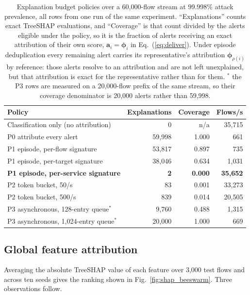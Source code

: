 \documentclass{ieeeaccess}
\begin{document}
\begin{table}[!t]
\caption{Explanation budget policies over a 60,000-flow stream at 99.998\% attack
prevalence, all rows from one run of the same experiment. ``Explanations'' counts
exact TreeSHAP evaluations, and ``Coverage'' is that count divided by the alerts
eligible under the policy, so it is the fraction of alerts receiving an exact
attribution of their own score, $\mathbf{a}_i = \boldsymbol{\phi}_i$ in
Eq.~(\ref{eq:deliver}). Under episode deduplication every remaining alert carries
its representative's attribution $\boldsymbol{\phi}_{\rho(i)}$ by reference: those
alerts resolve to an attribution and are not left unexplained, but that
attribution is exact for the representative rather than for them.
$^{\ast}$ the P3 rows are measured on a 20,000-flow prefix of the same stream, so
their coverage denominator is 20,000 alerts rather than 59,998.}
\centering
\label{tab:budget}
\footnotesize
\setlength{\tabcolsep}{4pt}
\renewcommand{\arraystretch}{1.15}
\begin{tabular}{@{}lrrr@{}}
\toprule
\textbf{Policy} & \textbf{Explanations} & \textbf{Coverage} & \textbf{Flows/s} \\
\midrule
Classification only (no attribution) & 0 & n/a & 35,715 \\
\midrule
P0 attribute every alert             & 59,998 & 1.000 & 661 \\
P1 episode, per-flow signature       & 53,817 & 0.897 & 735 \\
P1 episode, per-target signature     & 38,046 & 0.634 & 1,031 \\
\textbf{P1 episode, per-service signature} & \textbf{2} & \textbf{0.000} & \textbf{35,652} \\
P2 token bucket, 50/s                & 83 & 0.001 & 33,273 \\
P2 token bucket, 500/s               & 839 & 0.014 & 20,505 \\
P3 asynchronous, 128-entry queue$^{\ast}$   & 9,760 & 0.488 & 1,315 \\
P3 asynchronous, 1,024-entry queue$^{\ast}$ & 20,000 & 1.000 & 669 \\
\bottomrule
\end{tabular}
\end{table}

\subsection{Global feature attribution}
\label{sec:globalshap}
Averaging the absolute TreeSHAP value of each feature over 3{,}000 test flows and
across ten seeds gives the ranking shown in Fig.~\ref{fig:shap_beeswarm}. Three observations follow.
\end{document}
